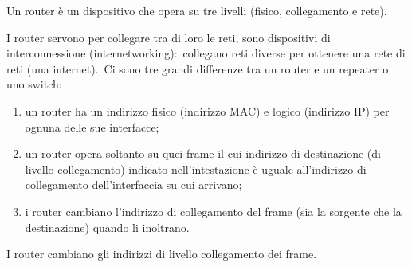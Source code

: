 \begin{center}
    Un router è un dispositivo che opera su tre livelli (fisico, collegamento e rete).
\end{center}
I router servono per collegare tra di loro le reti, sono dispositivi di interconnessione (internetworking):\ collegano reti diverse per ottenere una rete di reti (una internet).\
Ci sono tre grandi differenze tra un router e un repeater o uno switch:
\begin{enumerate}
    \item un router ha un indirizzo fisico (indirizzo MAC) e logico (indirizzo IP) per ognuna delle sue interfacce;
    \item un router opera soltanto su quei frame il cui indirizzo di destinazione (di livello collegamento) indicato nell'intestazione è uguale all'indirizzo di collegamento dell'interfaccia su cui arrivano;
    \item i router cambiano l'indirizzo di collegamento del frame (sia la sorgente che la destinazione) quando li inoltrano.
\end{enumerate}

\begin{center}
    I router cambiano gli indirizzi di livello collegamento dei frame.
\end{center}
